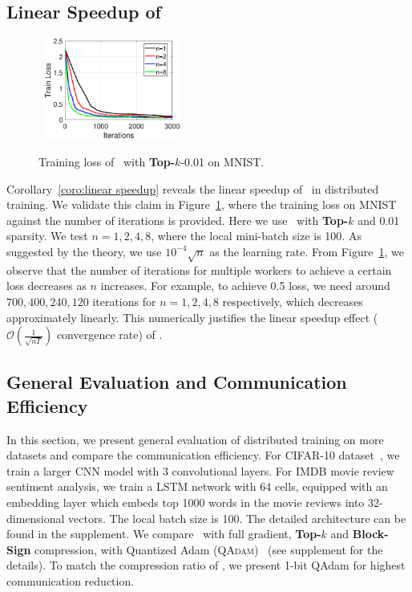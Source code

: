 \documentclass[11pt]{article}
\begin{document}
\subsection{Linear Speedup of \algo}

\begin{figure}
  \vspace{-0.35in}
  \begin{center}
   \mbox{\hspace{-0.05in}
    \includegraphics[width=0.4\textwidth]{fig/linear_speedup.eps}}
  \end{center}
  \vspace{-0.1in}
  \caption{Training loss of \algo\ with \textbf{Top-$k$}-0.01 on MNIST.}
  \label{fig:speedup}
\end{figure}

Corollary~\ref{coro:linear speedup} reveals the linear speedup of \algo\ in distributed training. We validate this claim in Figure~\ref{fig:speedup}, where the training loss on MNIST against the number of iterations is provided. Here we use \algo\ with \textbf{Top-$k$} and 0.01 sparsity. We test $n=1,2,4,8$, where the local mini-batch size is 100. As suggested by the theory, we use $10^{-4}\sqrt n$ as the learning rate. From Figure~\ref{fig:speedup}, we observe that the number of iterations for multiple workers to achieve a certain loss decreases as $n$ increases. For example, to achieve 0.5 loss, we need around $700,400,240,120$ iterations for $n=1,2,4,8$ respectively, which decreases approximately linearly. This numerically justifies the linear speedup effect ($\mathcal O(\frac{1}{\sqrt{nT}})$ convergence rate) of \algo.

\subsection{General Evaluation and Communication Efficiency}

In this section, we present general evaluation of distributed training on more datasets and compare the communication efficiency. For CIFAR-10 dataset~\cite{cifar}, we train a larger CNN model with 3 convolutional layers. For IMDB movie review~\cite{imdb} sentiment analysis, we train a LSTM network with 64 cells, equipped with an embedding layer which embeds top 1000 words in the movie reviews into 32-dimensional vectors. The local batch size is 100. The detailed architecture can be found in the supplement. We compare \algo\ with full gradient, \textbf{Top-$k$} and \textbf{Block-Sign} compression, with Quantized Adam (\textsc{QAdam})~\cite{chen2020quantized} (see supplement for the details). To match the compression ratio of \algo, we present 1-bit QAdam for highest communication reduction.
\end{document}

